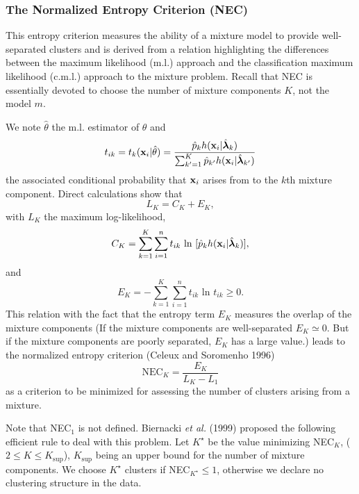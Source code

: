 \documentclass[12pt]{article}
\newcommand{\blambda}{\boldsymbol{\lambda}}
\begin{document}
\subsubsection{The Normalized Entropy Criterion (NEC)}
This entropy criterion measures the ability of a mixture model to provide well-separated
clusters and is derived from a relation highlighting the differences between the maximum
likelihood (m.l.) approach and the classification maximum likelihood (c.m.l.) approach to the
mixture problem. Recall that NEC is essentially devoted to choose the number of mixture
components $K$, not the model $m$.

We note $\hat\theta$ the m.l. estimator of $\theta$ and
\begin{equation}
  t_{ik} = t_k({\bf x}_i | \hat\theta) = \frac{\hat p_{k}h({\bf
      x}_{i}| \hat{\blambda}_{k})}{\sum_{k'=1}^{K}\hat p_{k'}h({\bf
      x}_{i}| \hat {\blambda}_{k'})}
\end{equation}
the associated conditional probability that ${\bf x}_i$ arises from to the $k$th mixture
component. Direct calculations show that
\begin{equation}
  L_K=C_K+E_K,
\end{equation}
with $L_K$ the maximum log-likelihood,
\begin{equation}
  C_K=\sum_{k=1}^{K}\sum_{i=1}^{n}t_{ik}\mbox{ ln }[\hat
  p_{k}h({\bf x}_{i}|\hat{\blambda}_{k})],
\end{equation}
and
\begin{equation}
  E_K=-\sum_{k=1}^{K}\sum_{i=1}^{n}t_{ik}\mbox{ ln }t_{ik} \geq 0.
\end{equation}
This relation with the fact that the entropy term $E_K$ measures the overlap of the mixture
components (If the mixture components are well-separated $E_K \simeq 0$.  But if the mixture
components are poorly separated, $E_K$ has a large value.) leads to the normalized entropy
criterion (Celeux and Soromenho 1996)
\begin{equation}
  \mbox{NEC}_K=\frac{E_K}{L_K-L_1}
\end{equation}
as a criterion to be minimized for assessing the number of clusters arising from a mixture.

Note that NEC$_1$ is not defined. Biernacki {\em et al.} (1999) proposed the following
efficient rule to deal with this problem.  Let $K^{\star}$ be the value minimizing NEC$_K$,
($2\leq K \leq K_{\mbox{sup}}$), $K_{\mbox{sup}}$ being an upper bound for the number of
mixture components. We choose $K^{\star}$ clusters if NEC$_{K^{\star}}\leq 1$, otherwise we
declare no clustering structure in the data.
\end{document}
